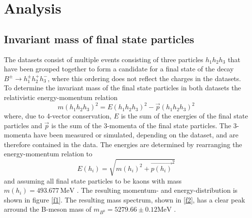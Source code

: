 \section{Analysis}\label{sec:analysis}

\subsection{Invariant mass of final state particles}
The datasets consist of multiple events consisting of three particles $h_1 h_2 h_3$ that have been grouped together to form a candidate for a final state 
of the decay $B^\pm \rightarrow h_1^\pm h_2^+ h_3^-$, where this ordering does not reflect the charges in the datasets. 
To determine the invariant mass of the final state particles in both datasets the relativistic energy-momentum relation 
\begin{equation}
  m(h_1 h_2 h_3)^2 = E(h_1 h_2 h_3)^2 - \vec{p}(h_1 h_2 h_3)^2
\end{equation}
where, due to 4-vector conservation, $E$ is the sum of the energies of the final state particles and $\vec{p}$ is the sum of the 3-momenta of the 
final state particles. The 3-momenta have been measured or simulated, depending on the dataset, and are therefore contained in the data. 
The energies are determined by rearranging the energy-momentum relation to 
\begin{equation}
  E(h_i) = \sqrt{m(h_i)^2 + \vec{p(h_i)}^2}
\end{equation}
and assuming all final state particles to be kaons with mass $m(h_i) = 493.677 \, \si{\mega\eV}$ \cite{pdg}. The resulting momentum- and energy-distribution 
is shown in figure \ref{f1}. The resulting mass spectrum, shown in \ref{f2}, has a clear peak arround the B-meson mass of 
$m_{B^0} = 5279.66 \pm 0.12 \si{\mega\eV}$ \cite{pdg}. 


